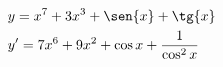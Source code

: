 \begin{ex}
\begin{align}
&y= x^7+3x^3+\sen{x}+\tg{x}\nonumber\\
&y'=7x^6+9x^2+\cos{x}+\frac{1}{\cos^2{x}}\nonumber
\end{align}
\end{ex}